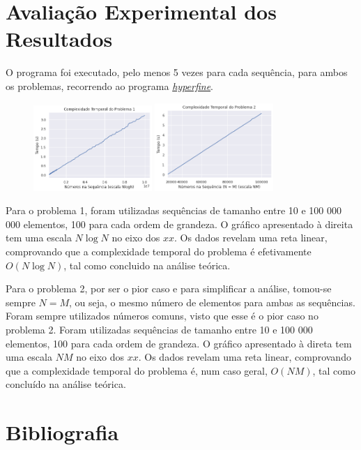 \documentclass[12pt,a4paper]{article}
\begin{document}
  \section{Avaliação Experimental dos Resultados}

  O programa foi executado, pelo menos 5 vezes para cada sequência, para ambos os problemas, recorrendo ao programa \href{https://github.com/sharkdp/hyperfine}{\textit{hyperfine}}.

  \begin{figure}
    \centering
    \includegraphics[width=0.4\textwidth]{report_prob1.png}
    \includegraphics[width=0.4\textwidth]{report_prob2.png}
  \end{figure}

  Para o problema 1, foram utilizadas sequências de tamanho entre 10 e 100 000 000 elementos, 100 para cada ordem de grandeza.
  O gráfico apresentado à direita tem uma escala $N \log N$ no eixo dos $xx$.
  Os dados revelam uma reta linear, comprovando que a complexidade temporal do problema é efetivamente $O(N\log N)$, tal como concluido na análise teórica.

  Para o problema 2, por ser o pior caso e para simplificar a análise, tomou-se sempre $N = M$, ou seja, o mesmo número de elementos para ambas as sequências.
  Foram sempre utilizados números comuns, visto que esse é o pior caso no problema 2.
  Foram utilizadas sequências de tamanho entre 10 e 100 000 elementos, 100 para cada ordem de grandeza.
  O gráfico apresentado à direta tem uma escala $NM$ no eixo dos $xx$.
  Os dados revelam uma reta linear, comprovando que a complexidade temporal do problema é, num caso geral, $O(NM)$, tal como concluído na análise teórica.

  \section{Bibliografia}

  \printbibliography
\end{document}
